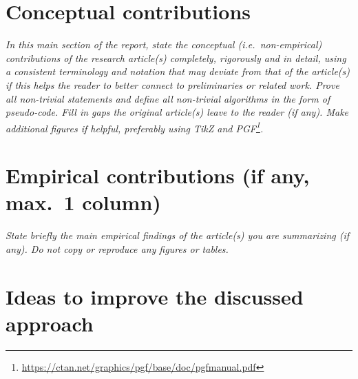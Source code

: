 \documentclass[10pt, twocolumn, a4paper]{article}
\theoremstyle{definition}
\begin{document}
\section{Conceptual contributions}

\emph{In this main section of the report, state the conceptual (i.e.~non-empirical) contributions of the research article(s) completely, rigorously and in detail, using a consistent terminology and notation that may deviate from that of the article(s) if this helps the reader to better connect to preliminaries or related work.
    Prove all non-trivial statements and define all non-trivial algorithms in the form of pseudo-code.
    Fill in gaps the original article(s) leave to the reader (if any).
    Make additional figures if helpful, preferably using TikZ and PGF\footnote{\url{https://ctan.net/graphics/pgf/base/doc/pgfmanual.pdf}}.}

\section{Empirical contributions (if any, max.~1 column)}

\emph{State briefly the main empirical findings of the article(s) you are summarizing (if any).
    Do not copy or reproduce any figures or tables.}

\section{Ideas to improve the discussed approach}



\end{document}
